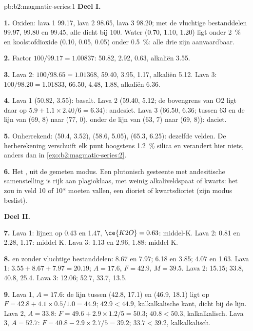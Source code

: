 \begin{solution}{pb:b2:magmatic-series:1}
\noindent\textbf{Deel I.}

\textbf{1.} Oxiden: lava 1 99.17, lava 2 98.65, lava 3 98.20; met de vluchtige bestanddelen
99.97, 99.80 en 99.45, alle dicht bij 100. Water (0.70, 1.10, 1.20) ligt onder
\qty{2}{\percent} en koolstofdioxide (0.10, 0.05, 0.05) onder \qty{0.5}{\percent}: alle
drie zijn aanvaardbaar.

\textbf{2.} Factor $100/99.17 = 1.00837$:  50.82,  2.92, 
0.63, alkaliën 3.55.

\textbf{3.} Lava 2: $100/98.65 = 1.01368$,  59.40,  3.95, 
1.17, alkaliën 5.12. Lava 3: $100/98.20 = 1.01833$,  66.50,  4.48,
 1.88, alkaliën 6.36.

\textbf{4.} Lava 1 (50.82, 3.55): basalt. Lava 2 (59.40, 5.12; de bovengrens van O2
ligt daar op $5.9 + 1.1\times2.40/6 = 6.34$): andesiet. Lava 3 (66.50, 6.36; tussen 63
en de lijn van (69, 8) naar (77, 0), onder de lijn van (63, 7) naar (69, 8)): daciet.

\textbf{5.} Onherrekend: (50.4, 3.52), (58.6, 5.05), (65.3, 6.25): dezelfde velden. De
herberekening verschuift elk punt hoogstens \qty{1.2}{\percent} silica en verandert
hier niets, anders dan in \cref{exo:b2:magmatic-series:2}.

\textbf{6.} Het , uit de gemeten modus. Een plutonisch gesteente met andesitische
samenstelling is rijk aan plagioklaas, met weinig alkaliveldspaat of kwarts: het zou
in veld 10 of 10* moeten vallen, een dioriet of kwartsdioriet (zijn modus beslist).

\noindent\textbf{Deel II.}

\textbf{7.} Lava 1: lijnen op 0.43 en 1.47, $\ce{K2O} = 0.63$: middel-K. Lava 2: 0.81
en 2.28, 1.17: middel-K. Lava 3: 1.13 en 2.96, 1.88: middel-K.

\textbf{8.}  en  zonder vluchtige bestanddelen: 8.67 en 7.97; 6.18 en 3.85; 4.07
en 1.63. Lava 1: $3.55 + 8.67 + 7.97 = 20.19$; $A = 17.6$, $F = 42.9$, $M = 39.5$.
Lava 2: 15.15; 33.8, 40.8, 25.4. Lava 3: 12.06; 52.7, 33.7, 13.5.

\textbf{9.} Lava 1, $A = 17.6$: de lijn tussen (42.8, 17.1) en (46.9, 18.1) ligt op
$F = 42.8 + 4.1\times0.5/1.0 = 44.9$; $42.9 < 44.9$, kalkalkalische kant, dicht bij de
lijn. Lava 2, $A = 33.8$: $F = 49.6 + 2.9\times1.2/5 = 50.3$; $40.8 < 50.3$,
kalkalkalisch. Lava 3, $A = 52.7$: $F = 40.8 - 2.9\times2.7/5 = 39.2$; $33.7 < 39.2$,
kalkalkalisch.


\end{solution}
